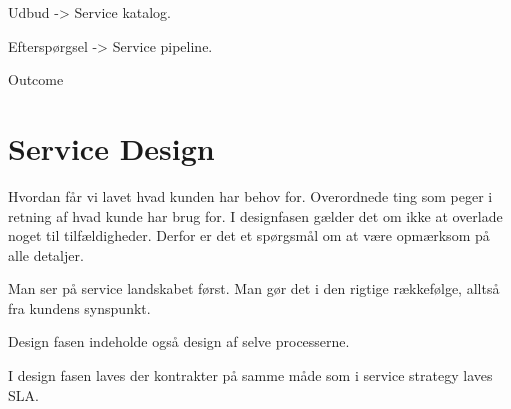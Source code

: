 Udbud -> Service katalog.

Efterspørgsel -> Service pipeline.

Outcome


\section{Service Design}
Hvordan får vi lavet hvad kunden har behov for. Overordnede ting som peger i retning af hvad kunde har brug for. I designfasen gælder det om ikke at overlade noget til tilfældigheder. Derfor er det et spørgsmål om at være opmærksom på alle detaljer.

Man ser på service landskabet først. Man gør det i den rigtige rækkefølge, alltså fra kundens synspunkt.

Design fasen indeholde også design af selve processerne.

I design fasen laves der kontrakter på samme måde som i service strategy laves SLA.






















%
%


